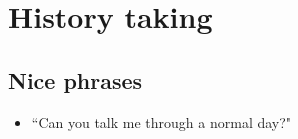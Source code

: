 \chapter{History taking}

\section{Nice phrases}


\begin{itemize}
	\item ``Can you talk me through a normal day?"
\end{itemize}
